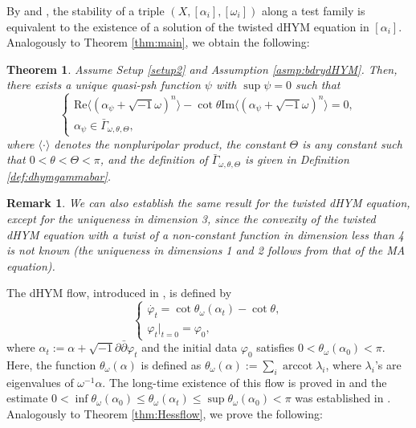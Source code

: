 \documentclass[10pt,a4paper]{amsart}
\numberwithin{equation}{section}
\newtheorem{thm}[equation]{Theorem}
\newtheorem{remark}[equation]{Remark}
\newcommand{\delb}{\sqrt{-1}\partial\bar{\partial}}
\begin{document}
By \cite[Theorem 1.3]{CLT} and \cite{Linb}, the stability of a triple $(X,[\alpha_i],[\omega_i])$ along a test family is equivalent to the existence of a solution of the twisted dHYM equation in $[\alpha_i]$. Analogously to Theorem \ref{thm:main}, we obtain the following:

\begin{thm}\label{thm:maindHYM}
    Assume Setup \ref{setup2} and Assumption \ref{asmp:bdrydHYM}. Then, there exists a unique quasi-psh function $\psi$ with $\sup\psi=0$ such that
    \begin{equation}\label{eq:dHYM}
        \begin{cases}
            \mathrm{Re}\langle(\alpha_\psi+\sqrt{-1}\omega)^n\rangle-\cot\theta\mathrm{Im}\langle(\alpha_\psi+\sqrt{-1}\omega)^n\rangle=0,\\
            \alpha_\psi\in\bar{\Gamma}_{\omega,\theta,\Theta},
        \end{cases}
    \end{equation}
    where $\langle\cdot\rangle$ denotes the nonpluripolar product, the constant $\Theta$ is any constant such that $0<\theta<\Theta<\pi$, and the definition of $\bar{\Gamma}_{\omega,\theta,\Theta}$ is given in Definition \ref{def:dhymgammabar}.
\end{thm}

\begin{remark}
        We can also establish the same result for the twisted dHYM equation, except for the uniqueness in dimension 3, since the convexity of the twisted dHYM equation with a twist of a non-constant function in dimension less than 4 is not known \cite[Proposition 5.6]{GChen} (the uniqueness in dimensions 1 and 2 follows from that of the MA equation).
\end{remark}

The dHYM flow, introduced in \cite{FYZ}, is defined by
\begin{equation*}
    \begin{cases}
        \dot{\varphi_t}=\cot\theta_\omega(\alpha_t)-\cot\theta,\\
        \varphi_t|_{t=0}=\varphi_0,
    \end{cases}
\end{equation*}
where $\alpha_t:=\alpha+\delb \varphi_t$ and the initial data $\varphi_0$ satisfies $0<\theta_\omega(\alpha_0)<\pi$. Here, the function $\theta_\omega(\alpha)$ is defined as  $\theta_\omega(\alpha):=\sum_i \operatorname{arccot}\lambda_i$, where $\lambda_i$'s are eigenvalues of $\omega^{-1}\alpha$.
The long-time existence of this flow is proved in \cite[Theorem 1.2]{FYZ} and the estimate $0<\inf\theta_\omega(\alpha_0)\le\theta_\omega(\alpha_t)\le\sup\theta_\omega(\alpha_0)<\pi$ was established in \cite[Lemma 3.2]{FYZ}.
Analogously to Theorem \ref{thm:Hessflow}, we prove the following:
\end{document}
